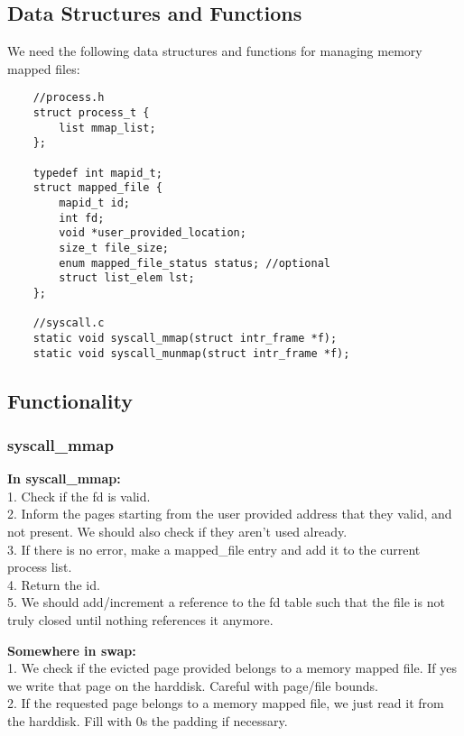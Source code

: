 \subsection{Data Structures and Functions}

We need the following data structures and functions for managing memory mapped files: 

\begin{lstlisting}
	//process.h
	struct process_t {
		list mmap_list;
	};

	typedef int mapid_t;
	struct mapped_file {
		mapid_t id;
		int fd;
		void *user_provided_location;
		size_t file_size;
		enum mapped_file_status status; //optional
		struct list_elem lst;
	};

	//syscall.c
	static void syscall_mmap(struct intr_frame *f);
	static void syscall_munmap(struct intr_frame *f);
\end{lstlisting}
	


\subsection{Functionality}

\subsubsection{ syscall\_mmap }
\textbf{In syscall\_mmap:}
	\\1. Check if the fd is valid.
	\\2. Inform the pages starting from the user provided address that they valid, and not present. We should also check if they aren't used already.
	\\3. If there is no error, make a mapped\_file entry and add it to the current process list.
	\\4. Return the id.
	\\5. We should add/increment a reference to the fd table such that the file is not truly closed until nothing references it anymore.



	\textbf{Somewhere in swap:}
	\\1. We check if the evicted page provided belongs to a memory mapped file. If yes we write that page on the harddisk. Careful with page/file bounds.
	\\2. If the requested page belongs to a memory mapped file, we just read it from the harddisk. Fill with 0s the padding if necessary.

